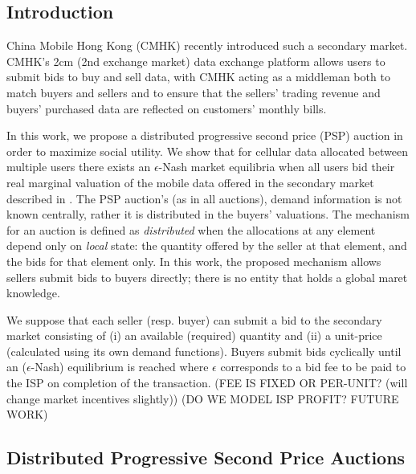 \documentclass[12pt]{article}
\theoremstyle{definition}
\begin{document}
\begin{multicols}{2}

\section{Introduction}
China Mobile Hong Kong (CMHK) recently introduced such a secondary market.
CMHK’s 2cm (2nd exchange market) data exchange platform allows users to submit
bids to buy and sell data, with CMHK acting as a middleman both to match buyers
and sellers and to ensure that the sellers’ trading revenue and buyers’
purchased data are reflected on customers’ monthly bills. \cite{zheng}

In this work, we propose a distributed progressive second price (PSP) auction in
order to maximize social utility. We show that for cellular data allocated between multiple users there
exists an $\epsilon$-Nash market equilibria when all users bid their real marginal
valuation of the mobile data offered in the secondary market described in
\cite{zheng}. The PSP auction's (as in all auctions),
demand information is not known centrally, rather it is distributed in the
buyers' valuations. The mechanism for an auction is defined
as \emph{distributed} when the allocations at any element depend only on
\emph{local} state: the quantity offered by the seller at that element, and the
bids for that element only. In this work, the proposed mechanism allows sellers submit bids to buyers
directly; there is no entity that holds a global maret knowledge.

We suppose that each seller (resp. buyer) can submit a bid to the secondary
market consisting of (i) an available (required) quantity and (ii) a unit-price (calculated
using its own demand functions). Buyers submit bids cyclically until an
($\epsilon$-Nash) equilibrium is reached where $\epsilon$ corresponds to a bid
fee to be paid to the ISP on completion of the transaction. (FEE IS FIXED OR
PER-UNIT? (will change market incentives slightly))
(DO WE MODEL ISP PROFIT? FUTURE WORK)

\subsection{Distributed Progressive Second Price Auctions}


\end{multicols}
\end{document}
